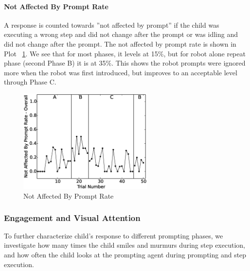 \paragraph{Not Affected By Prompt Rate}
A response is counted towards ''not affected by prompt'' if the child was executing a wrong step and did not change after the prompt or was idling and did not change after the prompt.  The not affected by prompt rate is shown in Plot \ \ref{fig:99NotAffectedByPromptRate-Overall}.  We see that for most phases, it levels at 15\%, but for robot alone repeat phase (second Phase B) it is at 35\%.  This shows the robot prompts were ignored more when the robot was first introduced, but improves to an acceptable level through Phase C.
\begin{figure} [h]
	\centering
	\includegraphics[width=0.6\textwidth]{./img/data_analysis/99NotAffectedByPromptRate-Overall.eps}
	\caption{Not Affected By Prompt Rate}
	\label{fig:99NotAffectedByPromptRate-Overall}
\end{figure}


\subsubsection{Engagement and Visual Attention}
To further characterize child's response to different prompting phases, we investigate how many times the child smiles and murmurs during step execution, and how often the child looks at the prompting agent during prompting and step execution.

